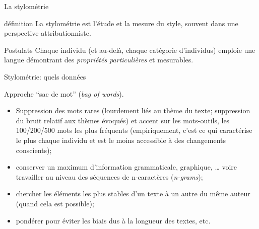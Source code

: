 \documentclass{beamer}
\begin{document}
%



\begin{frame}{La stylométrie}
	
	\begin{block}{définition}
		La stylométrie est l'étude et la mesure du \alert{style}, souvent dans une perspective
		attributionniste.
	\end{block}
	
	\begin{block}{Postulats}
		Chaque individu (et au-delà, chaque catégorie d'individus) emploie une langue démontrant des \textit{propriétés particulières} et \alert{mesurables}.
	\end{block}
	
	
\end{frame}


\begin{frame}{Stylométrie: quels données}

Approche ``\alert{sac de mot}'' (\textit{bag of words}).

\begin{itemize}
	\item Suppression des mots rares (lourdement liés au thème du texte; suppression du bruit relatif aux thèmes évoqués) et accent sur les mots-outils, les 100/200/500 mots les plus fréquents (empiriquement, c'est ce qui caractérise le plus chaque individu et est le moins accessible à des changements conscients);
	\item conserver un maximum d'information grammaticale,  graphique, … voire travailler au niveau des séquences de n-caractères (\textit{n-grams});
	\item chercher les éléments les plus stables d'un texte à un autre du même auteur (quand cela est possible);
	\item pondérer pour éviter les biais dus à la longueur des textes,  etc.
\end{itemize}

\end{frame}
\end{document}
